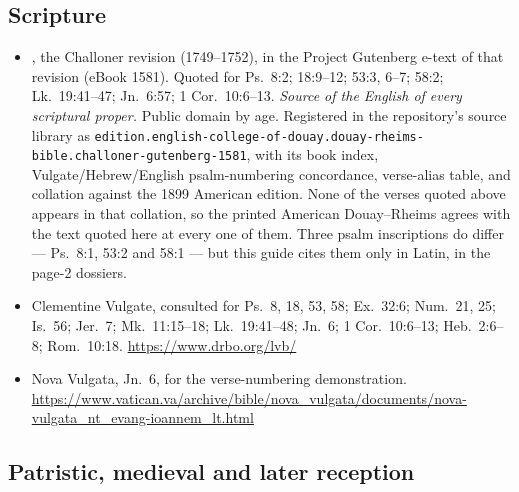 \subsection*{Scripture}

\begin{itemize}[leftmargin=1.2em, itemsep=0.15em]
\item {}, the Challoner revision
(1749--1752), in the Project Gutenberg e-text of that revision (eBook 1581).
Quoted for Ps.\ 8:2; 18:9--12; 53:3, 6--7; 58:2; Lk.\ 19:41--47; Jn.\ 6:57;
1 Cor.\ 10:6--13. \textit{Source of the English of every scriptural proper.}
Public domain by age. Registered in the repository's source library as
\texttt{edition.english-college-of-douay.douay-rheims-bible.challoner-gutenberg-1581},
with its book index, Vulgate/Hebrew/English psalm-numbering concordance,
verse-alias table, and collation against the 1899 American edition. None of the
verses quoted above appears in that collation, so the printed American
Douay--Rheims agrees with the text quoted here at every one of them. Three
psalm inscriptions do differ --- Ps.\ 8:1, 53:2 and 58:1 --- but this guide
cites them only in Latin, in the page-2 dossiers.
\item Clementine Vulgate, consulted for Ps.\ 8, 18, 53, 58; Ex.\ 32:6; Num.\
21, 25; Is.\ 56; Jer.\ 7; Mk.\ 11:15--18; Lk.\ 19:41--48; Jn.\ 6; 1 Cor.\
10:6--13; Heb.\ 2:6--8; Rom.\ 10:18. \url{https://www.drbo.org/lvb/}
\item Nova Vulgata, Jn.\ 6, for the verse-numbering demonstration.
\url{https://www.vatican.va/archive/bible/nova_vulgata/documents/nova-vulgata_nt_evang-ioannem_lt.html}
\end{itemize}

\subsection*{Patristic, medieval and later reception}

